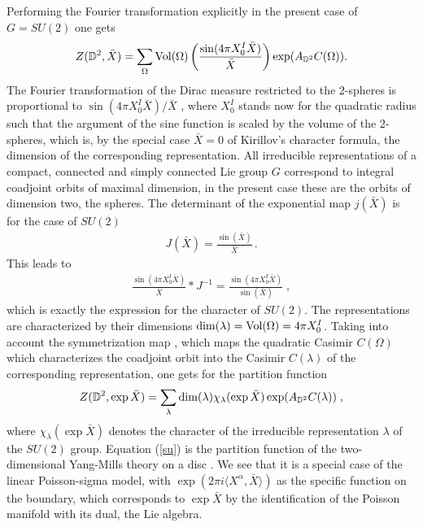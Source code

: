 \documentclass[a4paper,twoside,11pt]{article}
\numberwithin{equation}{section}
\begin{document}
Performing the Fourier transformation explicitly in the present case of $G=SU(2)$ one gets 
\begin{gather}
Z(\mathbb{D}^2,\bar{X})=\sum\limits_{\Omega}\text{Vol}(\Omega)\left(\frac{\sin(4\pi X^I_0\bar{X})}{\bar{X}}
\right)
\exp(A_{\mathbb{D}^2}C(\Omega)).
\end{gather}
The Fourier transformation of the Dirac measure restricted to the 2-spheres is proportional to 
$\sin(4\pi X^I_0\bar{X})/\bar{X}$ \cite{CD}, where $X^I_0$ stands now for the quadratic radius such 
that the argument of the sine function is scaled by the volume of the 2-spheres, which is, by the special case  
$\bar{X}=0$ of Kirillov's character formula, the dimension of the corresponding representation. 
All irreducible representations of 
a compact, connected and simply connected Lie group $G$ correspond to integral coadjoint orbits of maximal 
dimension, in the present case these are the orbits of dimension two, the spheres. The determinant of the 
exponential map $j(\bar{X})$ is for the case of $SU(2)$
\begin{gather}
J(\bar{X})=\frac{\sin(\bar{X})}{\bar{X}}\,.
\end{gather}
This leads to
\begin{gather}
\frac{\sin(4\pi X^I_0\bar{X})}{\bar{X}}*J^{-1}=\frac{\sin(4\pi X^I_0\bar{X})}{\sin(\bar{X})}\;,
\end{gather}
which is exactly the expression for the character of $SU(2)$. The representations are characterized by their 
dimensions $\dim(\lambda)=\text{Vol}(\Omega)=4\pi X^I_0$. Taking into account the symmetrization map 
\cite{KL}, which maps 
the quadratic Casimir $C(\Omega)$ which characterizes the coadjoint orbit into the Casimir 
$C(\lambda)$ of the corresponding representation, one gets for the partition function
\begin{gather}
Z(\mathbb{D}^2,\exp\bar{X})=\sum\limits_{\lambda}{\rm dim}(\lambda)\chi_\lambda(\exp\bar{X})
\exp(A_{\mathbb{D}^2}C(\lambda))\;,
\label{su}\end{gather}
where $\chi_\lambda(\exp\bar{X})$ denotes the character of the irreducible representation $\lambda$ of the $SU(2)$ group.
Equation (\ref{su}) is the partition function of the two-dimensional Yang-Mills theory on a disc \cite{BT}. We see that it is a 
special case of the linear Poisson-sigma model, with 
$\exp(2\pi i\langle X^\alpha,\bar{X}\rangle)$ as the specific function on the boundary, which corresponds to 
 $\exp\bar{X}$ by the identification of the Poisson manifold with its dual, the Lie algebra.
%
%
\end{document}
